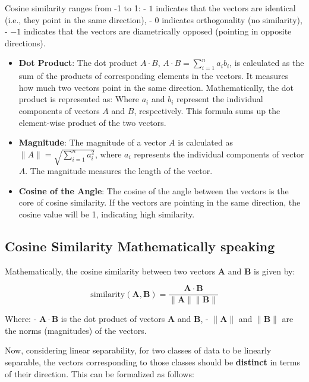 \documentclass[
  12 pt,
  a4paper,
]{book}
\numberwithin{equation}{section}
\theoremstyle{plain}      %
\theoremstyle{definition} %
\theoremstyle{remark}     %
\theoremstyle{note}         %
\begin{document}
Cosine similarity ranges from -1 to 1: - \(1\) indicates that the
vectors are identical (i.e., they point in the same direction), - \(0\)
indicates orthogonality (no similarity), - \(-1\) indicates that the
vectors are diametrically opposed (pointing in opposite directions).

\begin{itemize}
\item
  \textbf{Dot Product}: The dot product \(A \cdot B\),
  \(A \cdot B = \sum_{i=1}^{n} a_i b_i\), is calculated as the sum of
  the products of corresponding elements in the vectors. It measures how
  much two vectors point in the same direction. Mathematically, the dot
  product is represented as: Where \(a_i\) and \(b_i\) represent the
  individual components of vectors \(A\) and \(B\), respectively. This
  formula sums up the element-wise product of the two vectors.
\item
  \textbf{Magnitude}: The magnitude of a vector \(A\) is calculated as
  \(\|A\| = \sqrt{\sum_{i=1}^{n} a_i^2}\), where \(a_i\) represents the
  individual components of vector \(A\). The magnitude measures the
  length of the vector.
\item
  \textbf{Cosine of the Angle}: The cosine of the angle between the
  vectors is the core of cosine similarity. If the vectors are pointing
  in the same direction, the cosine value will be 1, indicating high
  similarity.
\end{itemize}

\hypertarget{cosine-similarity-mathematically-speaking}{%
\subsection{Cosine Similarity Mathematically
speaking}\label{cosine-similarity-mathematically-speaking}}

Mathematically, the cosine similarity between two vectors \(\mathbf{A}\)
and \(\mathbf{B}\) is given by:

\[
\text{similarity}(\mathbf{A}, \mathbf{B}) = \frac{\mathbf{A} \cdot \mathbf{B}}{\|\mathbf{A}\| \|\mathbf{B}\|}
\]

Where: - \(\mathbf{A} \cdot \mathbf{B}\) is the dot product of vectors
\(\mathbf{A}\) and \(\mathbf{B}\), - \(\|\mathbf{A}\|\) and
\(\|\mathbf{B}\|\) are the norms (magnitudes) of the vectors.

Now, considering linear separability, for two classes of data to be
linearly separable, the vectors corresponding to those classes should be
\textbf{distinct} in terms of their direction. This can be formalized as
follows:
\end{document}
